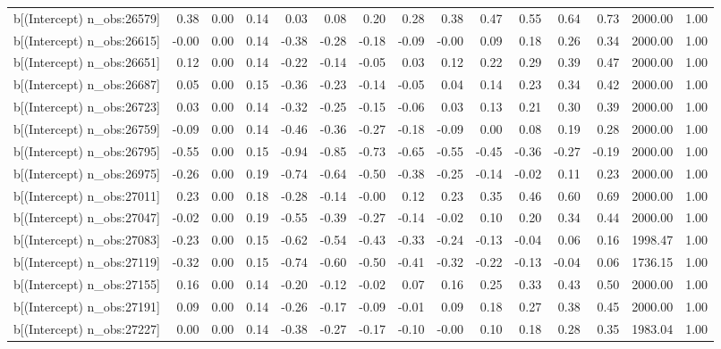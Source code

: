 \begin{table}[ht]
\begin{tabular}{rrrrrrrrrrrrrrr}
  b[(Intercept) n\_obs:26579] & 0.38 & 0.00 & 0.14 & 0.03 & 0.08 & 0.20 & 0.28 & 0.38 & 0.47 & 0.55 & 0.64 & 0.73 & 2000.00 & 1.00 \\ 
  b[(Intercept) n\_obs:26615] & -0.00 & 0.00 & 0.14 & -0.38 & -0.28 & -0.18 & -0.09 & -0.00 & 0.09 & 0.18 & 0.26 & 0.34 & 2000.00 & 1.00 \\ 
  b[(Intercept) n\_obs:26651] & 0.12 & 0.00 & 0.14 & -0.22 & -0.14 & -0.05 & 0.03 & 0.12 & 0.22 & 0.29 & 0.39 & 0.47 & 2000.00 & 1.00 \\ 
  b[(Intercept) n\_obs:26687] & 0.05 & 0.00 & 0.15 & -0.36 & -0.23 & -0.14 & -0.05 & 0.04 & 0.14 & 0.23 & 0.34 & 0.42 & 2000.00 & 1.00 \\ 
  b[(Intercept) n\_obs:26723] & 0.03 & 0.00 & 0.14 & -0.32 & -0.25 & -0.15 & -0.06 & 0.03 & 0.13 & 0.21 & 0.30 & 0.39 & 2000.00 & 1.00 \\ 
  b[(Intercept) n\_obs:26759] & -0.09 & 0.00 & 0.14 & -0.46 & -0.36 & -0.27 & -0.18 & -0.09 & 0.00 & 0.08 & 0.19 & 0.28 & 2000.00 & 1.00 \\ 
  b[(Intercept) n\_obs:26795] & -0.55 & 0.00 & 0.15 & -0.94 & -0.85 & -0.73 & -0.65 & -0.55 & -0.45 & -0.36 & -0.27 & -0.19 & 2000.00 & 1.00 \\ 
  b[(Intercept) n\_obs:26975] & -0.26 & 0.00 & 0.19 & -0.74 & -0.64 & -0.50 & -0.38 & -0.25 & -0.14 & -0.02 & 0.11 & 0.23 & 2000.00 & 1.00 \\ 
  b[(Intercept) n\_obs:27011] & 0.23 & 0.00 & 0.18 & -0.28 & -0.14 & -0.00 & 0.12 & 0.23 & 0.35 & 0.46 & 0.60 & 0.69 & 2000.00 & 1.00 \\ 
  b[(Intercept) n\_obs:27047] & -0.02 & 0.00 & 0.19 & -0.55 & -0.39 & -0.27 & -0.14 & -0.02 & 0.10 & 0.20 & 0.34 & 0.44 & 2000.00 & 1.00 \\ 
  b[(Intercept) n\_obs:27083] & -0.23 & 0.00 & 0.15 & -0.62 & -0.54 & -0.43 & -0.33 & -0.24 & -0.13 & -0.04 & 0.06 & 0.16 & 1998.47 & 1.00 \\ 
  b[(Intercept) n\_obs:27119] & -0.32 & 0.00 & 0.15 & -0.74 & -0.60 & -0.50 & -0.41 & -0.32 & -0.22 & -0.13 & -0.04 & 0.06 & 1736.15 & 1.00 \\ 
  b[(Intercept) n\_obs:27155] & 0.16 & 0.00 & 0.14 & -0.20 & -0.12 & -0.02 & 0.07 & 0.16 & 0.25 & 0.33 & 0.43 & 0.50 & 2000.00 & 1.00 \\ 
  b[(Intercept) n\_obs:27191] & 0.09 & 0.00 & 0.14 & -0.26 & -0.17 & -0.09 & -0.01 & 0.09 & 0.18 & 0.27 & 0.38 & 0.45 & 2000.00 & 1.00 \\ 
  b[(Intercept) n\_obs:27227] & 0.00 & 0.00 & 0.14 & -0.38 & -0.27 & -0.17 & -0.10 & -0.00 & 0.10 & 0.18 & 0.28 & 0.35 & 1983.04 & 1.00 \\ 

\end{tabular}
\end{table}
